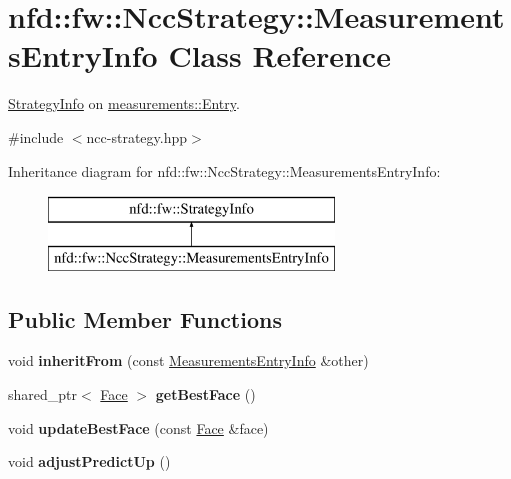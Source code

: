 \hypertarget{classnfd_1_1fw_1_1NccStrategy_1_1MeasurementsEntryInfo}{}\section{nfd\+:\+:fw\+:\+:Ncc\+Strategy\+:\+:Measurements\+Entry\+Info Class Reference}
\label{classnfd_1_1fw_1_1NccStrategy_1_1MeasurementsEntryInfo}


\hyperlink{classnfd_1_1fw_1_1StrategyInfo}{Strategy\+Info} on \hyperlink{classnfd_1_1measurements_1_1Entry}{measurements\+::\+Entry}.  




{\ttfamily \#include $<$ncc-\/strategy.\+hpp$>$}

Inheritance diagram for nfd\+:\+:fw\+:\+:Ncc\+Strategy\+:\+:Measurements\+Entry\+Info\+:\begin{figure}[H]
\begin{center}
\leavevmode
\includegraphics[height=2.000000cm]{classnfd_1_1fw_1_1NccStrategy_1_1MeasurementsEntryInfo}
\end{center}
\end{figure}
\subsection*{Public Member Functions}
\begin{DoxyCompactItemize}
\item 
void {\bfseries inherit\+From} (const \hyperlink{classnfd_1_1fw_1_1NccStrategy_1_1MeasurementsEntryInfo}{Measurements\+Entry\+Info} \&other)\hypertarget{classnfd_1_1fw_1_1NccStrategy_1_1MeasurementsEntryInfo_a8007b1fd4966c0cc0b5c46a65ccbcd90}{}\label{classnfd_1_1fw_1_1NccStrategy_1_1MeasurementsEntryInfo_a8007b1fd4966c0cc0b5c46a65ccbcd90}

\item 
shared\+\_\+ptr$<$ \hyperlink{classnfd_1_1Face}{Face} $>$ {\bfseries get\+Best\+Face} ()\hypertarget{classnfd_1_1fw_1_1NccStrategy_1_1MeasurementsEntryInfo_a3a4276c32f14a5e30bb77548fff37d26}{}\label{classnfd_1_1fw_1_1NccStrategy_1_1MeasurementsEntryInfo_a3a4276c32f14a5e30bb77548fff37d26}

\item 
void {\bfseries update\+Best\+Face} (const \hyperlink{classnfd_1_1Face}{Face} \&face)\hypertarget{classnfd_1_1fw_1_1NccStrategy_1_1MeasurementsEntryInfo_a80cde3cd8649c6cbe8fa551a13a9d43d}{}\label{classnfd_1_1fw_1_1NccStrategy_1_1MeasurementsEntryInfo_a80cde3cd8649c6cbe8fa551a13a9d43d}

\item 
void {\bfseries adjust\+Predict\+Up} ()\hypertarget{classnfd_1_1fw_1_1NccStrategy_1_1MeasurementsEntryInfo_ab60d8c9bdb685a2ce67266eda72bcfc8}{}\label{classnfd_1_1fw_1_1NccStrategy_1_1MeasurementsEntryInfo_ab60d8c9bdb685a2ce67266eda72bcfc8}

\end{DoxyCompactItemize}

